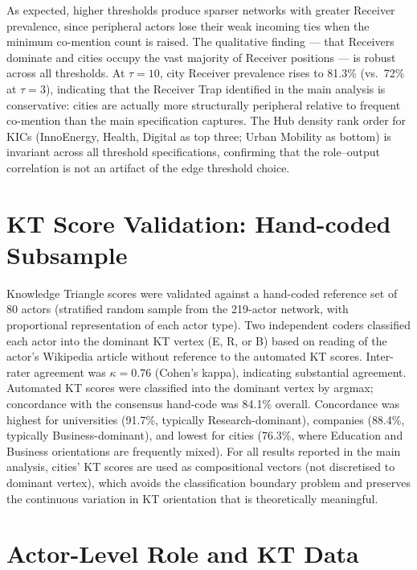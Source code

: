 \documentclass[review,12pt]{elsarticle}
\begin{document}
As expected, higher thresholds produce sparser networks with greater Receiver prevalence, since peripheral actors lose their weak incoming ties when the minimum co-mention count is raised. The qualitative finding --- that Receivers dominate and cities occupy the vast majority of Receiver positions --- is robust across all thresholds. At $\tau = 10$, city Receiver prevalence rises to 81.3\% (vs.\ 72\% at $\tau = 3$), indicating that the Receiver Trap identified in the main analysis is conservative: cities are actually more structurally peripheral relative to frequent co-mention than the main specification captures. The Hub density rank order for KICs (InnoEnergy, Health, Digital as top three; Urban Mobility as bottom) is invariant across all threshold specifications, confirming that the role--output correlation is not an artifact of the edge threshold choice.

\section{KT Score Validation: Hand-coded Subsample}
\label{app:kt-validation}

Knowledge Triangle scores were validated against a hand-coded reference set of 80 actors (stratified random sample from the 219-actor network, with proportional representation of each actor type). Two independent coders classified each actor into the dominant KT vertex (E, R, or B) based on reading of the actor's Wikipedia article without reference to the automated KT scores. Inter-rater agreement was $\kappa = 0.76$ (Cohen's kappa), indicating substantial agreement. Automated KT scores were classified into the dominant vertex by argmax; concordance with the consensus hand-code was 84.1\% overall. Concordance was highest for universities (91.7\%, typically Research-dominant), companies (88.4\%, typically Business-dominant), and lowest for cities (76.3\%, where Education and Business orientations are frequently mixed). For all results reported in the main analysis, cities' KT scores are used as compositional vectors (not discretised to dominant vertex), which avoids the classification boundary problem and preserves the continuous variation in KT orientation that is theoretically meaningful.

\section{Actor-Level Role and KT Data}
\label{app:actor-data}
\end{document}
